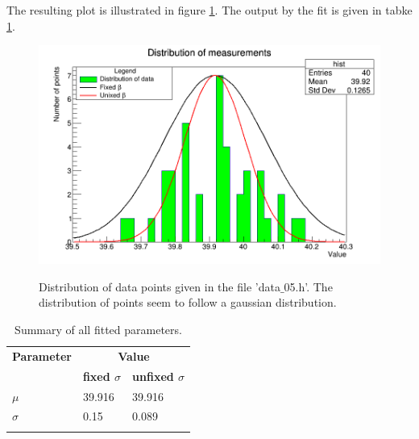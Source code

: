 \documentclass[10pt]{article}
\newenvironment{myfont}{\fontfamily{put}\selectfont}{\par}
\begin{document}
\begin{myfont}
The resulting plot is illustrated in figure \ref{fig:gaussian_distribution}.
The output by the fit is given in tabke \ref{tab:ex5_2}.

\begin{figure}[H]
  \centering
  \caption{Distribution of data points given in the file 'data$\_$05.h'.
  The distribution of points seem to follow a gaussian distribution.}
  \includegraphics[width = \textwidth]{./exercise5_2.png}
  \label{fig:gaussian_distribution}
\end{figure}

\begin{longtable}{*{3}l}
\caption{Summary of all fitted parameters.}\endfirsthead
\endhead
\toprule
\textbf{Parameter} & \multicolumn{2}{c}{\textbf{Value}} \\
\cmidrule{2-3}
 & \textbf{fixed $\sigma$} & \textbf{unfixed $\sigma$} \\
\midrule
$\mu$    & \num{39.916} & \num{39.916} \\ 
$\sigma$ & \num{0.15}   & \num{0.089}  \\
\bottomrule
\label{tab:ex5_2}
\end{longtable}

\end{myfont}
\end{document}
